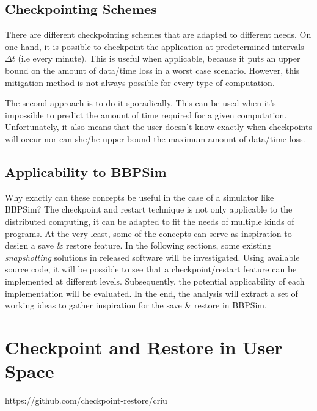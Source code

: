 {\subsection*{Checkpointing Schemes}
There are different checkpointing schemes that are adapted to different needs. On one hand, it is possible to checkpoint the application at predetermined intervals $\Delta t$ (i.e every minute). This is useful when applicable, because it puts an upper bound on the amount of data/time loss in a worst case scenario. However, this mitigation method is not always possible for every type of computation. 

The second approach is to do it sporadically. This can be used when it's impossible to predict the amount of time required for a given computation. Unfortunately, it also means that the user doesn't know exactly when checkpoints will occur nor can she/he upper-bound the maximum amount of data/time loss.

\subsection*{Applicability to BBPSim}
Why exactly can these concepts be useful in the case of a simulator like BBPSim? The checkpoint and restart technique is not only applicable to the distributed computing, it can be adapted to fit the needs of multiple kinds of programs. At the very least, some of the concepts can serve as inspiration to design a save \& restore feature. In the following sections, some existing \textit{snapshotting} solutions in released software will be investigated. Using available source code, it will be possible to see that a checkpoint/restart feature can be implemented at different levels. Subsequently, the potential applicability of each implementation will be evaluated. In the end, the analysis will extract a set of working ideas to gather inspiration for the save \& restore in BBPSim.




\section{Checkpoint and Restore in User Space}\label{sec:criu}
https://github.com/checkpoint-restore/criu





}